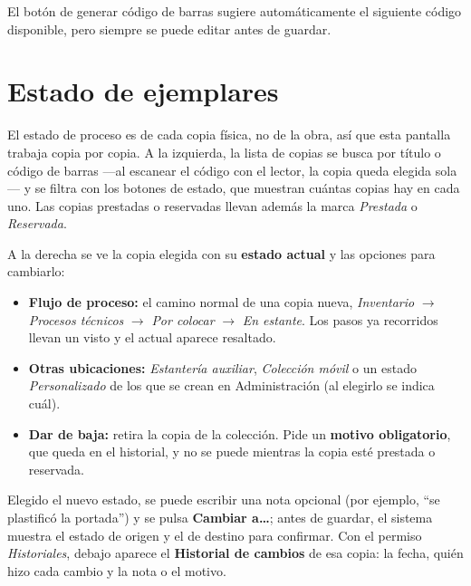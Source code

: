\documentclass[11pt,a4paper]{report}
\begin{document}
El botón de generar código de barras sugiere automáticamente el
siguiente código disponible, pero siempre se puede editar antes de
guardar.

\section{Estado de ejemplares}


El estado de proceso es de cada copia física, no de la obra, así que esta
pantalla trabaja copia por copia. A la izquierda, la lista de copias se
busca por título o código de barras ---al escanear el código con el
lector, la copia queda elegida sola--- y se filtra con los botones de
estado, que muestran cuántas copias hay en cada uno. Las copias prestadas
o reservadas llevan además la marca \emph{Prestada} o \emph{Reservada}.


A la derecha se ve la copia elegida con su \textbf{estado actual} y las
opciones para cambiarlo:

\begin{itemize}
  \item \textbf{Flujo de proceso:} el camino normal de una copia nueva,
  \emph{Inventario} $\rightarrow$ \emph{Procesos técnicos} $\rightarrow$
  \emph{Por colocar} $\rightarrow$ \emph{En estante}. Los pasos ya
  recorridos llevan un visto y el actual aparece resaltado.
  \item \textbf{Otras ubicaciones:} \emph{Estantería auxiliar},
  \emph{Colección móvil} o un estado \emph{Personalizado} de los que se
  crean en Administración (al elegirlo se indica cuál).
  \item \textbf{Dar de baja:} retira la copia de la colección. Pide un
  \textbf{motivo obligatorio}, que queda en el historial, y no se puede
  mientras la copia esté prestada o reservada.
\end{itemize}

Elegido el nuevo estado, se puede escribir una nota opcional (por
ejemplo, ``se plastificó la portada'') y se pulsa \textbf{Cambiar
a\ldots}; antes de guardar, el sistema muestra el estado de origen y el
de destino para confirmar. Con el permiso \textit{Historiales}, debajo
aparece el \textbf{Historial de cambios} de esa copia: la fecha, quién
hizo cada cambio y la nota o el motivo.
\end{document}
